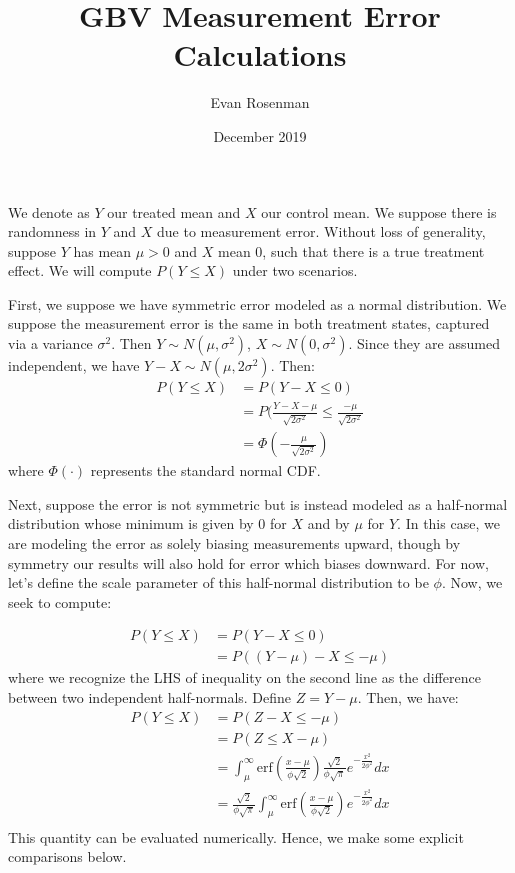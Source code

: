 \documentclass{article}
\title{GBV Measurement Error Calculations}
\author{Evan Rosenman}
\date{December 2019}
\begin{document}
\maketitle

We denote as $Y$ our treated mean and $X$ our control mean. We suppose there is randomness in $Y$ and $X$ due to measurement error. Without loss of generality, suppose $Y$ has mean $\mu > 0$ and $X$ mean 0, such that there is a true treatment effect. We will compute $P(Y \leq X)$ under two scenarios. 

First, we suppose we have symmetric error modeled as a normal distribution. We suppose the measurement error is the same in both treatment states, captured via a variance $\sigma^2$. Then $Y \sim N(\mu, \sigma^2)$, $X \sim N(0, \sigma^2)$. Since they are assumed independent, we have $Y - X \sim N(\mu, 2 \sigma^2)$. Then: 
\begin{align*}
P(Y \leq X) &= P(Y - X \leq 0) \\
&= P(\frac{Y-X - \mu}{\sqrt{2 \sigma^2}} \leq \frac{-\mu}{\sqrt{2\sigma^2}} \\
&= \Phi\left( - \frac{\mu}{\sqrt{2\sigma^2}} \right)
\end{align*}
where $\Phi(\cdot)$ represents the standard normal CDF. 

Next, suppose the error is not symmetric but is instead modeled as a half-normal distribution whose minimum is given by 0 for $X$ and by $\mu$ for $Y$. In this case, we are modeling the error as solely biasing measurements upward, though by symmetry our results will also hold for error which biases downward. For now, let's define the scale parameter of this half-normal distribution to be $\phi$. Now, we seek to compute: 

\begin{align*}
P(Y \leq X) &= P(Y - X \leq 0) \\
&= P((Y - \mu) - X \leq - \mu) 
\end{align*}
where we recognize the LHS of inequality on the second line as the difference between two independent half-normals. Define $Z = Y - \mu$. Then, we have: 
\begin{align*}
P(Y \leq X) &= P(Z - X \leq - \mu) \\
&= P(Z \leq X - \mu) \\
&= \int_{\mu}^\infty \text{erf}\left( \frac{x-\mu}{\phi \sqrt{2}} \right) \frac{\sqrt{2}}{\phi \sqrt{\pi}} e^{-\frac{x^2}{2\phi^2}} dx \\
&= \frac{\sqrt{2}}{\phi \sqrt{\pi}} \int_{\mu}^\infty \text{erf}\left( \frac{x-\mu}{\phi \sqrt{2}} \right)  e^{-\frac{x^2}{2\phi^2}} dx \\
\end{align*}
This quantity can be evaluated numerically. Hence, we make some explicit comparisons below. 
\end{document}
